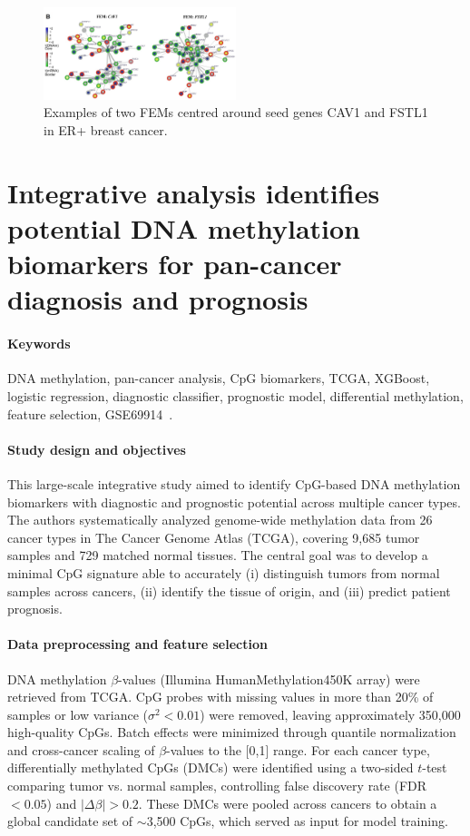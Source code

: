 \documentclass[10pt]{extarticle}
\begin{document}
\begin{figure}[h]
    \centering
    \includegraphics[width=0.5\textwidth]{Figures/Examples of two FEMs centred around seed genes CAV1 and FSTL1 in ER+ breast cancer.jpg} %
    \caption{Examples of two FEMs centred around seed genes CAV1 and FSTL1 in ER+ breast cancer.}
    \label{fig:FEMs}
\end{figure}


\section{Integrative analysis identifies potential DNA methylation biomarkers for pan-cancer diagnosis and prognosis}

\paragraph{Keywords}
DNA methylation, pan-cancer analysis, CpG biomarkers, TCGA, XGBoost, logistic regression, diagnostic classifier, prognostic model, differential methylation, feature selection, GSE69914~\cite{ding2019pancancer}.

\paragraph{Study design and objectives}
This large-scale integrative study aimed to identify CpG-based DNA methylation biomarkers with diagnostic and prognostic potential across multiple cancer types. The authors systematically analyzed genome-wide methylation data from 26 cancer types in The Cancer Genome Atlas (TCGA), covering 9,685 tumor samples and 729 matched normal tissues. The central goal was to develop a minimal CpG signature able to accurately (i) distinguish tumors from normal samples across cancers, (ii) identify the tissue of origin, and (iii) predict patient prognosis.

\paragraph{Data preprocessing and feature selection}
DNA methylation $\beta$-values (Illumina HumanMethylation450K array) were retrieved from TCGA. CpG probes with missing values in more than 20\% of samples or low variance ($\sigma^2 < 0.01$) were removed, leaving approximately 350,000 high-quality CpGs. Batch effects were minimized through quantile normalization and cross-cancer scaling of $\beta$-values to the [0,1] range.  
For each cancer type, differentially methylated CpGs (DMCs) were identified using a two-sided $t$-test comparing tumor vs. normal samples, controlling false discovery rate (FDR $<0.05$) and $|\Delta\beta| > 0.2$. These DMCs were pooled across cancers to obtain a global candidate set of $\sim$3,500 CpGs, which served as input for model training.
\end{document}
